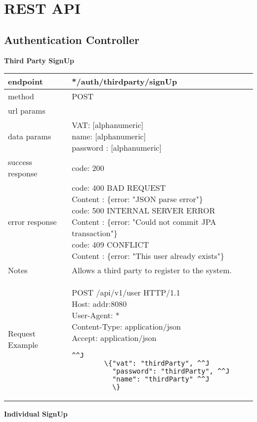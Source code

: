 \section{REST API} 



\subsection{Authentication Controller}

\textbf{Third Party SignUp} \\

\begin{tabularx}{\linewidth}{| l| l }
	\hline
	endpoint & */auth/thirdparty/signUp \\
	\hline
	method & POST \\
	\hline
	url params & \\
	\hline
	data params &
	\parbox{0.7\textwidth}{
		\bigskip
		VAT: [alphanumeric]\\
		name: [alphanumeric]\\
		password : [alphanumeric]
		\bigskip
	} \\
	\hline
	success response &
	\parbox{0.7\textwidth}{
		\bigskip
		code: 200\\
	} \\
	\hline
	error response &
	\parbox{0.7\textwidth}{
		\bigskip
		code: 400 BAD REQUEST \\
		Content : \{error: "JSON parse error"\}\\
		code: 500 INTERNAL SERVER ERROR \\
		Content : \{error: "Could not commit JPA transaction"\}\\
		code: 409 CONFLICT \\
		Content : \{error: "This user already exists"\}
		\bigskip
	} \\
	\hline
	Notes & 
	\parbox{0.7\textwidth}{
		\bigskip Allows a third party to register to the system.
	\bigskip}  \\
	\hline
		Request Example & 
		\parbox{0.8\textwidth}{
		\bigskip
		POST /api/v1/user HTTP/1.1 \\
		Host: {addr}:8080 \\
		User-Agent: * \\
		Content-Type: application/json \\
		Accept: application/json \\
		\bigskip
		\begin{lstlisting}^^J
		\{"vat": "thirdParty", ^^J
		  "password": "thirdParty", ^^J
		  "name": "thirdParty" ^^J
		  \}
		\end{lstlisting}
	} \\
	\hline
\end{tabularx}
\newpage
\textbf{Individual SignUp} \\

